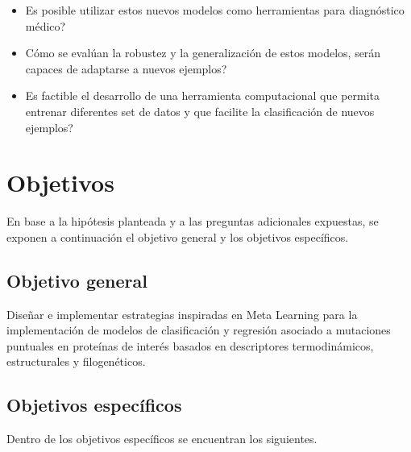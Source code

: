 \begin{itemize}
	
	\item Es posible utilizar estos nuevos modelos como herramientas para diagnóstico médico?
	\item Cómo se evalúan la robustez y la generalización de estos modelos, serán capaces de adaptarse a nuevos ejemplos?
	\item Es factible el desarrollo de una herramienta computacional que permita entrenar diferentes set de datos y que facilite la clasificación de nuevos ejemplos?
	
\end{itemize}

\section{Objetivos}

En base a la hipótesis planteada y a las preguntas adicionales expuestas, se exponen a continuación el objetivo general y los objetivos específicos.

\subsection{Objetivo general}

Diseñar e implementar estrategias inspiradas en Meta Learning para la implementación de modelos de clasificación y regresión asociado a mutaciones puntuales en proteínas de interés basados en descriptores termodinámicos, estructurales y filogenéticos.

\subsection{Objetivos específicos}

Dentro de los objetivos específicos se encuentran los siguientes.


